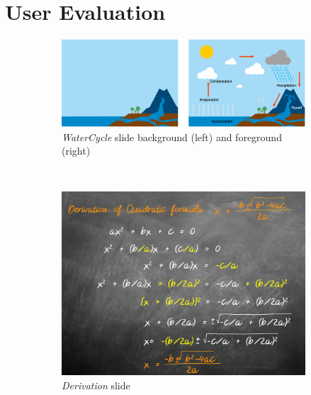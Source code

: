 \section{User Evaluation}
\begin{figure}[t!]
    \centering
    \begin{subfigure}[t]{1\columnwidth}
        \centering
        \includegraphics[width=1\columnwidth]{figures/watercycle}
        \caption{\textit{WaterCycle} slide background (left) and foreground (right)}
    \end{subfigure}
    ~ 
    \begin{subfigure}[t]{0.48\columnwidth}
        \centering
        \includegraphics[width=1\columnwidth]{figures/quadformula}
        \caption{\textit{Derivation} slide}
    \end{subfigure}  
    ~
    \begin{subfigure}[t]{0.48\columnwidth}
        \centering

\end{subfigure}
\end{figure}
